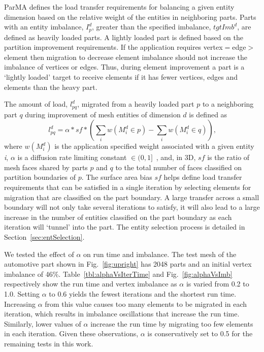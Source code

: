 ParMA defines the load transfer requirements for balancing a given entity
dimension based on the relative weight of the entities in neighboring parts.
Parts with an entity imbalance, $I^d_p$, greater than the specified imbalance, $tgtImb^d$,
are defined as heavily loaded parts.
A lightly loaded part is defined based on the partition improvement requirements.
If the application requires vertex$=$edge$>$element then migration to decrease
element imbalance should not increase the imbalance of vertices or edges.
Thus, during element improvement a part is a `lightly loaded' target to receive
elements if it has fewer vertices, edges and elements than the heavy part.

The amount of load, $l_{pq}^{d}$, migrated from a heavily loaded part $p$ to a
neighboring part $q$ during improvement of mesh entities of dimension $d$ is
defined as
\begin{equation}
  l_{pq}^{d}=\alpha*sf*\left( \sum_{i}{w(M^d_i \in p)} - \sum_{i}{w(M^d_i \in q)}\right) \text{,}
\label{eqn:migrW}
\end{equation}
where $w(M^d_i)$ is the application specified weight associated with a given
entity {\textit i}, $\alpha$ is a diffusion rate limiting constant $\in
(0,1]$~\cite{cybenko1989dynamic}, and, in 3D, $sf$ is
the ratio of mesh faces shared by parts $p$ and $q$ to the
total number of faces classified on partition boundaries of $p$.
The surface area bias $sf$ helps define load transfer requirements that can be
satisfied in a single iteration by selecting elements for migration that are
classified on the part boundary.
A large transfer across a small boundary will not only take several iterations
to satisfy, it will also lead to a large increase in the number of entities
classified on the part boundary as each iteration will `tunnel' into the part.
The entity selection process is detailed in Section~\ref{sec:entSelection}.


We tested the effect of $\alpha$ on run time and imbalance.
The test mesh of the automotive part shown in Fig.~\ref{fig:upright} has 2048
parts and an initial vertex imbalance of 46\%.
Table~\ref{tbl:alphaVsIterTime} and
Fig.~\ref{fig:alphaVsImb} respectively show the run time and vertex imbalance
as $\alpha$ is varied from 0.2 to 1.0.
Setting $\alpha$ to 0.6 yields the fewest iterations and the shortest run time.
Increasing $\alpha$ from this value causes too many elements to be migrated in
each iteration, which results in imbalance oscillations that increase the run
time.
Similarly, lower values of $\alpha$ increase the run time by migrating too few
elements in each iteration.
Given these observations, $\alpha$ is conservatively set to 0.5 for the
remaining tests in this work.

